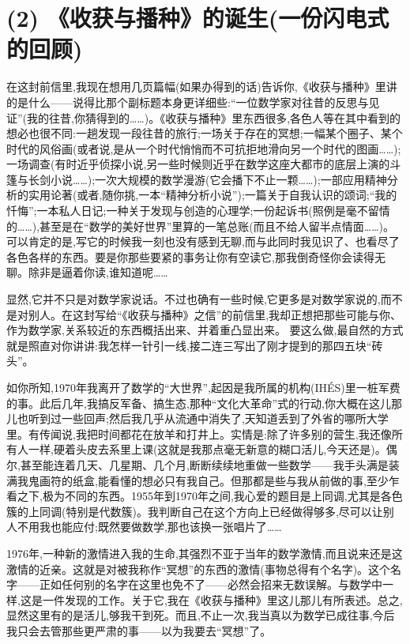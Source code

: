 \section{(2) 《收获与播种》的诞生(一份闪电式的回顾)}

在这封前信里,我现在想用几页篇幅(如果办得到的话)告诉你,《收获与播种》里讲的是什么——说得比那个副标题本身更详细些:“一位数学家对往昔的反思与见证”(我的往昔,你猜得到的……)。《收获与播种》里东西很多,各色人等在其中看到的想必也很不同:一趟发现一段往昔的旅行;一场关于存在的冥想;一幅某个圈子、某个时代的风俗画(或者说,是从一个时代悄悄而不可抗拒地滑向另一个时代的图画……);一场调查(有时近乎侦探小说,另一些时候则近乎在数学这座大都市的底层上演的斗篷与长剑小说……);一次大规模的数学漫游(它会播下不止一颗……);一部应用精神分析的实用论著(或者,随你挑,一本“精神分析小说”);一篇关于自我认识的颂词;“我的忏悔”;一本私人日记;一种关于发现与创造的心理学;一份起诉书(照例是毫不留情的……),甚至是在“数学的美好世界”里算的一笔总账(而且不给人留半点情面……)。可以肯定的是,写它的时候我一刻也没有感到无聊,而与此同时我见识了、也看尽了各色各样的东西。要是你那些要紧的事务让你有空读它,那我倒奇怪你会读得无聊。除非是逼着你读,谁知道呢……

显然,它并不只是对数学家说话。不过也确有一些时候,它更多是对数学家说的,而不是对别人。在这封写给“《收获与播种》之信”的前信里,我却正想把那些可能与你、作为数学家,关系较近的东西概括出来、并着重凸显出来。
要这么做,最自然的方式就是照直对你讲讲:我怎样一针引一线,接二连三写出了刚才提到的那四五块“砖头”。

如你所知,1970年我离开了数学的“大世界”,起因是我所属的机构(IHÉS)里一桩军费的事。此后几年,我搞反军备、搞生态,那种“文化大革命”式的行动,你大概在这儿那儿也听到过一些回声;然后我几乎从流通中消失了,天知道丢到了外省的哪所大学里。有传闻说,我把时间都花在放羊和打井上。实情是:除了许多别的营生,我还像所有人一样,硬着头皮去系里上课(这就是我那点毫无新意的糊口活儿,今天还是)。偶尔,甚至能连着几天、几星期、几个月,断断续续地重做一些数学——我手头满是装满我鬼画符的纸盒,能看懂的想必只有我自己。但那都是些与我从前做的事,至少乍看之下,极为不同的东西。1955年到1970年之间,我心爱的题目是上同调,尤其是各色簇的上同调(特别是代数簇)。我判断自己在这个方向上已经做得够多,尽可以让别人不用我也能应付;既然要做数学,那也该换一张唱片了……

1976年,一种新的激情进入我的生命,其强烈不亚于当年的数学激情,而且说来还是这激情的近亲。这就是对被我称作“冥想”的东西的激情(事物总得有个名字)。这个名字——正如任何别的名字在这里也免不了——必然会招来无数误解。与数学中一样,这是一件发现的工作。关于它,我在《收获与播种》里这儿那儿有所表述。总之,显然这里有的是活儿,够我干到死。而且,不止一次,我当真以为数学已成往事,今后我只会去管那些更严肃的事——以为我要去“冥想”了。

